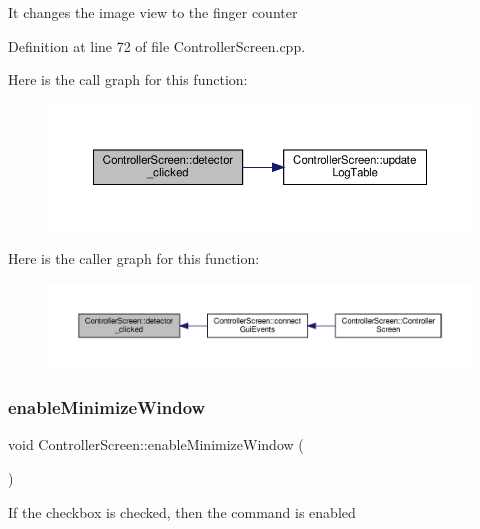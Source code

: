 It changes the image view to the finger counter 

Definition at line 72 of file Controller\+Screen.\+cpp.

Here is the call graph for this function\+:
\nopagebreak
\begin{figure}[H]
\begin{center}
\leavevmode
\includegraphics[width=350pt]{class_controller_screen_ac4f535408ffdfa10cbfa1a89d833f592_cgraph}
\end{center}
\end{figure}
Here is the caller graph for this function\+:
\nopagebreak
\begin{figure}[H]
\begin{center}
\leavevmode
\includegraphics[width=350pt]{class_controller_screen_ac4f535408ffdfa10cbfa1a89d833f592_icgraph}
\end{center}
\end{figure}
\mbox{\label{class_controller_screen_ad27b95368191153fa12d05091728b022}} 
\subsubsection{\texorpdfstring{enable\+Minimize\+Window}{enableMinimizeWindow}}
{\footnotesize\ttfamily void Controller\+Screen\+::enable\+Minimize\+Window (\begin{DoxyParamCaption}{ }\end{DoxyParamCaption})\hspace{0.3cm}{\ttfamily [slot]}}

If the checkbox is checked, then the command is enabled 

